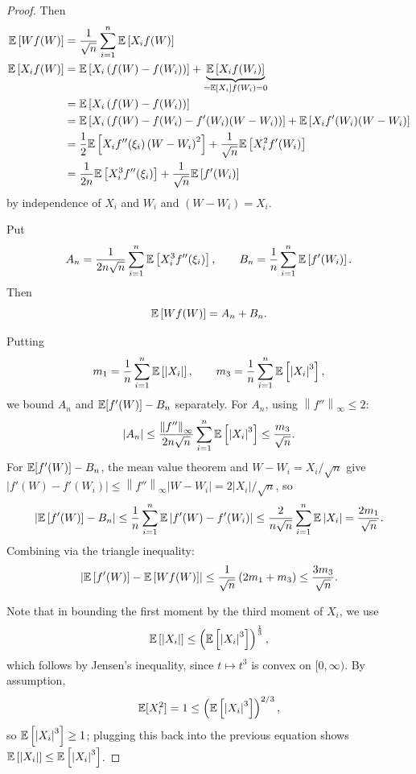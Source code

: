 \begin{proof}
	Then 
	\begin{align*}
		\mathbb{E}\left[W f(W)\right] 
		&= \frac{1}{\sqrt{n} } \sum\limits_{i=1}^{n}  \mathbb{E}\left[X_i f(W)\right] \\
		\mathbb{E}\left[X_i f(W)\right]
		&= \mathbb{E}\left[X_i \left( f(W) - f(W_i) \right)\right] + \underbrace{\mathbb{E}\left[X_i f(W_i)\right] }_{= \mathbb{E}\left[X_i\right] f(W_i) = 0}\\
		&= \mathbb{E}\left[X_i \left( f(W) - f(W_i) \right)\right] \\
		&= \mathbb{E}\left[X_i \left( f(W) - f(W_i) - f'(W_i)(W-W_i) \right)\right] + \mathbb{E}\left[X_i f'(W_i) (W-W_i)\right] \\
		&= \frac{1}{2} \mathbb{E}\left[X_i f''(\xi_i) \left( W - W_i \right)^2\right] + \frac{1}{\sqrt{n} } \mathbb{E}\left[X_i^2 f'(W_i)\right] \\
		&= \frac{1}{2n} \mathbb{E}\left[X_i^3 f''(\xi_i)\right] + \frac{1}{\sqrt{n}} \mathbb{E}\left[f'(W_i)\right] 
	\end{align*}
	by independence of $X_i$ and $W_i$ and $(W-W_i) = X_i$.

	Put
	\[
		A_n = \frac{1}{2n\sqrt{n}} \sum\limits_{i=1}^{n} \mathbb{E}\left[X_i^3 f''(\xi_i)\right],
		\qquad
		B_n = \frac{1}{n} \sum\limits_{i=1}^{n} \mathbb{E}\left[f'(W_i)\right].
	\]
	Then
	\[
		\mathbb{E}\left[Wf(W)\right] = A_n + B_n.
	\]

	Putting
	\[
		m_1 = \frac{1}{n} \sum\limits_{i=1}^{n} \mathbb{E}\left[\left| X_i \right|\right],
		\qquad
		m_3 = \frac{1}{n} \sum\limits_{i=1}^{n} \mathbb{E}\left[\left| X_i \right|^3\right],
	\]
	we bound $A_n$ and $\mathbb{E}[f'(W)] - B_n$ separately. For $A_n$, using $\left\| f'' \right\|_\infty \le 2$:
	\[
		\left| A_n \right|
		\le \frac{\left\| f'' \right\|_\infty}{2n\sqrt{n}} \sum\limits_{i=1}^{n} \mathbb{E}\left[\left| X_i \right|^3\right]
		\le \frac{m_3}{\sqrt{n}}.
	\]
	For $\mathbb{E}[f'(W)] - B_n$, the mean value theorem and $W - W_i = X_i/\sqrt{n}$ give $\left| f'(W) - f'(W_i) \right| \le \left\| f'' \right\|_\infty \left| W - W_i \right| = 2\left| X_i \right|/\sqrt{n}$, so
	\[
		\left| \mathbb{E}\left[f'(W)\right] - B_n \right|
		\le \frac{1}{n} \sum\limits_{i=1}^{n} \mathbb{E}\left| f'(W) - f'(W_i) \right|
		\le \frac{2}{n\sqrt{n}} \sum\limits_{i=1}^{n} \mathbb{E}\left| X_i \right|
		= \frac{2m_1}{\sqrt{n}}.
	\]
	Combining via the triangle inequality:
	\[
		\left| \mathbb{E}\left[f'(W)\right] - \mathbb{E}\left[Wf(W)\right] \right|
		\le \frac{1}{\sqrt{n}}\left(2m_1 + m_3\right)
		\le \frac{3m_3}{\sqrt{n}}.
	\]

	Note that in bounding the first moment by the third moment of $X_i$, we use
	\[
		\mathbb{E}\left[\left| X_i \right|\right] \le \left( \mathbb{E}\left[\left| X_i \right|^3\right] \right)^{\frac{1}{3}}
	,\]
	which follows by Jensen's inequality, since $t \mapsto t^3$ is convex on $[0,\infty)$.
	By assumption,
	\[
		\mathbb{E}[X_i^2] = 1 \le \left(\mathbb{E}\left[\left|X_i\right|^3\right]\right)^{2/3}
	,\]
	so $\mathbb{E}\left[\left| X_i \right|^3\right] \ge 1$; plugging this back into the previous equation shows $\mathbb{E}\left[\left| X_i \right|\right] \le \mathbb{E}\left[\left| X_i \right|^3\right] $.


\end{proof}

